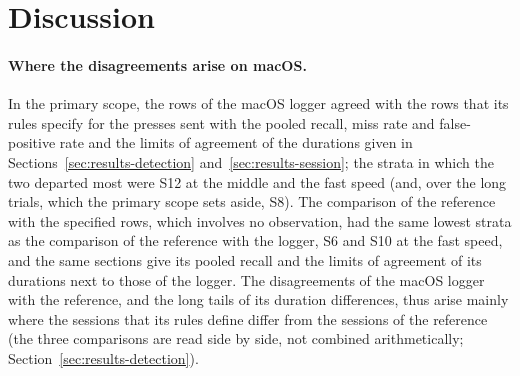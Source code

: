 
\section{Discussion}
\label{sec:discussion}

\paragraph{Where the disagreements arise on macOS.} In the primary scope, the rows of the macOS logger agreed with the
rows that its rules specify for the presses sent with the pooled recall, miss rate and false-positive rate and the
limits of agreement of the durations given in Sections~\ref{sec:results-detection} and~\ref{sec:results-session}; the
strata in which the two departed most were S12 at the middle and the fast speed (and, over the long trials, which the
primary scope sets aside, S8). The
comparison of the reference with the specified rows, which involves no observation, had the same lowest strata as the
comparison of the reference with the logger, S6 and S10 at the fast speed, and the same sections give its pooled
recall and the limits of agreement of its durations next to those of the logger. The disagreements of the macOS logger
with the reference, and the long tails of its duration differences, thus arise mainly where the sessions that its
rules define differ from the sessions of the reference (the three comparisons are read side by side, not combined
arithmetically; Section~\ref{sec:results-detection}).

